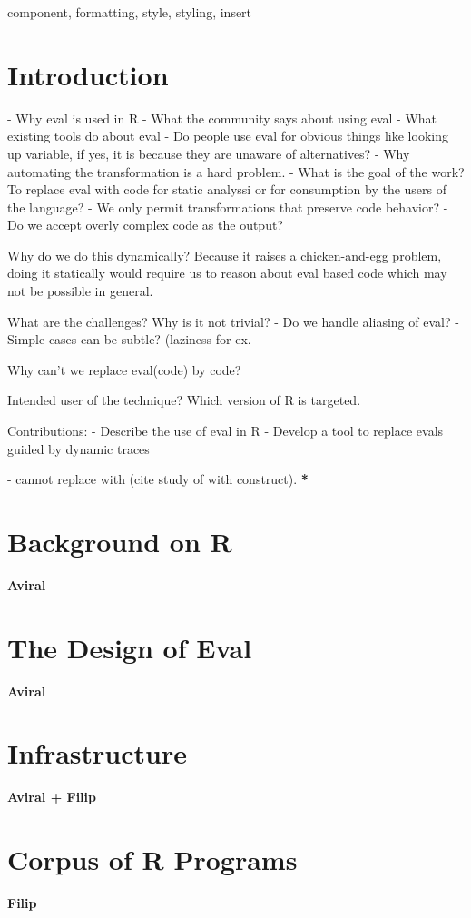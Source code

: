 \documentclass[conference]{IEEEtran}
\begin{document}
\begin{IEEEkeywords}
component, formatting, style, styling, insert
\end{IEEEkeywords}

\section{Introduction}
- Why eval is used in R
- What the community says about using eval
- What existing tools do about eval
- Do people use eval for obvious things like looking up variable, if yes, it is
because they are unaware of alternatives?
- Why automating the transformation is a hard problem.
- What is the goal of the work? To replace eval with code for static analyssi or
for consumption by the users of the language?
- We only permit transformations that preserve code behavior?
- Do we accept overly complex code as the output?

Why do we do this dynamically? Because it raises a chicken-and-egg problem,
doing it statically would require us to reason about eval based code which may
not be possible in general.


What are the challenges? Why is it not trivial?
- Do we handle aliasing of eval?
- Simple cases can be subtle? (laziness for ex.

Why can't we replace eval(code) by code?

Intended user of the technique? Which version of R is targeted.

Contributions:
- Describe the use of eval in R
- Develop a tool to replace evals guided by dynamic traces


- cannot replace with (cite study of with construct).
\textbf{*}

\section{Background on R}
\textbf{Aviral}

\section{The Design of Eval}
\textbf{Aviral}

\section{Infrastructure}
\textbf{Aviral + Filip}

\section{Corpus of R Programs}
\textbf{Filip}
\end{document}
